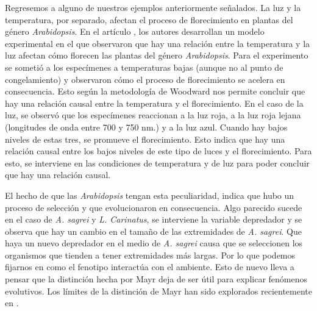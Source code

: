 Regresemos a alguno de nuestros ejemplos anteriormente señalados. La luz y la temperatura, por separado,  afectan el proceso de florecimiento en plantas del género \emph{Arabidopsis}. En el artículo \cite{AusinEnviro}, los autores desarrollan un modelo experimental en el que observaron que hay una relación entre la temperatura y la luz afectan cómo florecen las plantas del género \emph{Arabidopsis}. Para el experimento se sometió a los especímenes a temperaturas bajas (aunque no al punto de congelamiento) y observaron cómo el proceso de florecimiento se acelera en consecuencia. Esto según la metodología de Woodward nos permite concluir que hay una relación causal entre la temperatura y el florecimiento. En el caso de la luz, se observó que los especímenes reaccionan a la luz roja, a la luz roja lejana (longitudes de onda entre 700 y 750 nm.) y a la luz azul. Cuando hay bajos niveles de estas tres, se promueve el florecimiento. Esto indica que hay una relación causal entre los bajos niveles de este tipo de luces y el florecimiento. Para esto, se interviene en las condiciones de temperatura y de luz para poder concluir que hay una relación causal.

\begin{center}
\end{center}

El hecho de que las \emph{Arabidopsis} tengan esta peculiaridad, indica que hubo un proceso de selección y que evolucionaron en consecuencia. Algo parecido sucede en el caso de \emph{A. sagrei} y \emph{L. Carinatus}, se interviene la variable depredador y se observa que hay un cambio en el tamaño de las extremidades de \emph{A. sagrei}. Que haya un nuevo depredador en el medio de \emph{A. sagrei} causa que se seleccionen los organismos que tienden a tener extremidades más largas. Por lo que podemos fijarnos en como el fenotipo interactúa con el ambiente. Esto de nuevo lleva a pensar que la distinción hecha por Mayr deja de ser útil para explicar fenómenos evolutivos. Los límites de la distinción de Mayr han sido explorados recientemente en \cite{Uller2020, Dayan2020, Laland2011}.

